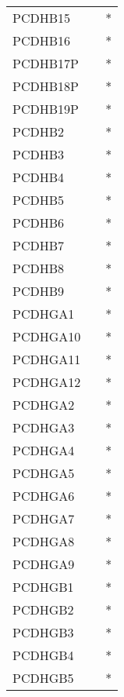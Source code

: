 \begin{longtable}{lcc}
PCDHB15         &                &          * \\
PCDHB16         &                &          * \\
PCDHB17P        &                &          * \\
PCDHB18P        &                &          * \\
PCDHB19P        &                &          * \\
PCDHB2          &                &          * \\
PCDHB3          &                &          * \\
PCDHB4          &                &          * \\
PCDHB5          &                &          * \\
PCDHB6          &                &          * \\
PCDHB7          &                &          * \\
PCDHB8          &                &          * \\
PCDHB9          &                &          * \\
PCDHGA1         &                &          * \\
PCDHGA10        &                &          * \\
PCDHGA11        &                &          * \\
PCDHGA12        &                &          * \\
PCDHGA2         &                &          * \\
PCDHGA3         &                &          * \\
PCDHGA4         &                &          * \\
PCDHGA5         &                &          * \\
PCDHGA6         &                &          * \\
PCDHGA7         &                &          * \\
PCDHGA8         &                &          * \\
PCDHGA9         &                &          * \\
PCDHGB1         &                &          * \\
PCDHGB2         &                &          * \\
PCDHGB3         &                &          * \\
PCDHGB4         &                &          * \\
PCDHGB5         &                &          * \\

\end{longtable}
